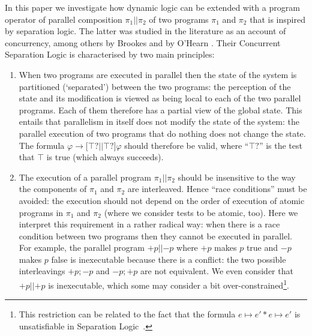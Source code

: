 \documentclass{llncs}
\newcommand{\pll}{ {||} }							%
\newcommand{\testendo}{?\!\!?}			%
\newcommand{\testpdl}{?}				%
\newcommand{\ah}[1]{\**\marginpar{\textbf{AH:} #1}}
\newcommand{\assgntopV}[1]{{\mathtt {+} #1}}
\newcommand{\assgnbotV}[1]{{\mathtt {-} #1}}
\newcommand{\lbox}[1]{ \big[ #1 \big] }
\newcommand{\limp}{ \rightarrow }
\newcommand{\ndet}{\,{\cup}\,}
\renewcommand{\phi}{\varphi}
\begin{document}
In this paper we investigate how dynamic logic can be extended with 
a program operator of parallel composition $\pi_1 \pll \pi_2$ of two programs $\pi_1$ and $\pi_2$ 
that is inspired by separation logic. 
The latter was studied in the literature as an account of concurrency,
among others by Brookes and by O'Hearn %
\cite{OHearn04,Brookes04,BrookesO16}.
Their Concurrent Separation Logic is characterised by two main principles:
\begin{enumerate}
\item
When two programs are executed in parallel then 
the state of the system is partitioned (`separated') between the two programs: 
the perception of the state and its modification is viewed as 
being local to each of the two parallel programs. 
Each of them therefore has a partial view of the global state. 
This entails that parallelism in itself does not modify the state of the system:
the parallel execution of two programs that do nothing does not change the state. 
The formula 
$\phi \limp \lbox{ \top ? \pll \top ? } \phi$ 
should therefore be valid, where ``$ \top ? $'' is the test that $\top$ is true (which always succeeds).
\item
The execution of a parallel program $\pi_1 \pll \pi_2$ should be insensitive to 
the way the components of $\pi_1$ and $\pi_2$ are interleaved. 
Hence ``race conditions'' \cite{BrookesO16} must be avoided: 
the execution should not depend on the order of execution of atomic programs in $\pi_1$ and $\pi_2$ 
(where we consider tests to be atomic, too). 
Here we interpret this requirement in a rather radical way: 
when there is a race condition between two programs then they cannot be executed in parallel. 
For example, the parallel program $\assgntopV p \pll \assgnbotV p $
where $\assgntopV p$ makes $p$ true and $\assgnbotV p $ makes $p$ false 
is inexecutable because there is a conflict: 
the two possible interleavings 
$\assgntopV p ; \assgnbotV p $ and $\assgnbotV p  ; \assgntopV p $ are not equivalent. 
We even consider that $ \assgntopV p \pll \assgntopV p$ %
is inexecutable,
which some may consider a bit over-constrained\footnote{This restriction can be related to the fact that
the formula $e \mathrel\mapsto e' \mathbin\ast e \mathrel\mapsto e'$ is unsatisfiable in Separation Logic~\cite{Reynolds02}.}.
\end{enumerate}
\end{document}
